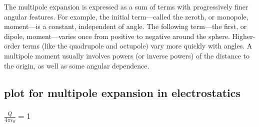 \documentclass[12pt,a4paper]{article}
\begin{document}
The multipole expansion is expressed as a sum of terms with progressively finer angular features. For example, the initial term—called the zeroth, or monopole, moment—is a constant, independent of angle. The following term—the first, or dipole, moment—varies once from positive to negative around the sphere. Higher-order terms (like the quadrupole and octupole) vary more quickly with angles. A multipole moment usually involves powers (or inverse powers) of the distance to the origin, as well as some angular dependence.
\subsection{plot for multipole expansion in electrostatics}
\subsubsection{$\frac{Q}{4\pi\epsilon_0} = 1$}
 \\
\end{document}
